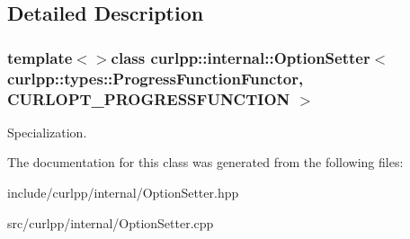 \subsection{Detailed Description}
\subsubsection*{template$<$$>$class curlpp\-::internal\-::\-Option\-Setter$<$ curlpp\-::types\-::\-Progress\-Function\-Functor, C\-U\-R\-L\-O\-P\-T\-\_\-\-P\-R\-O\-G\-R\-E\-S\-S\-F\-U\-N\-C\-T\-I\-O\-N $>$}

Specialization. 

The documentation for this class was generated from the following files\-:\begin{DoxyCompactItemize}
\item 
include/curlpp/internal/Option\-Setter.\-hpp\item 
src/curlpp/internal/Option\-Setter.\-cpp\end{DoxyCompactItemize}
